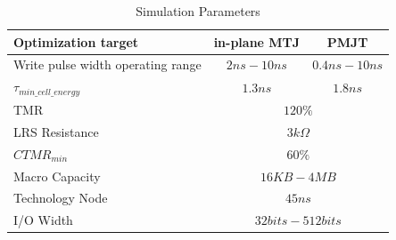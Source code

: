 \begin{table}[t]
\centering
\caption{Simulation Parameters}
\label{tb:parameters}
\vspace{-5pt}
\begin{tabular}{ l | c | c }
\hline \hline
Optimization target & in-plane MTJ & PMJT\\
\hline
Write pulse width operating range & $2ns-10ns$ & $0.4ns-10ns$\\
\hline
$\tau_{min\_cell\_energy}$ & $1.3ns$ & $1.8ns$\\
\hline
TMR & \multicolumn{2}{c}{$120\%$}\\
\hline
LRS Resistance & \multicolumn{2}{c}{$3k\Omega$}\\
\hline
$CTMR_{min}$ & \multicolumn{2}{c}{$60\%$} \\
\hline
Macro Capacity & \multicolumn{2}{c}{$16KB - 4MB$}\\
\hline
Technology Node & \multicolumn{2}{c}{$45ns$}\\
\hline
I/O Width & \multicolumn{2}{c}{$32bits-512bits$}\\
\hline\hline
\end{tabular}
\vspace{-10pt}
\end{table}

